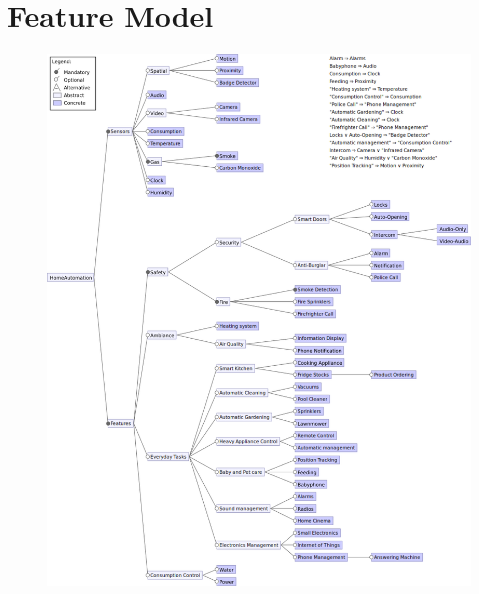     \section{Feature Model}
        \begin{figure}[H]
            \includegraphics[width=\textwidth]{FeatureModel.png}
        \end{figure}


